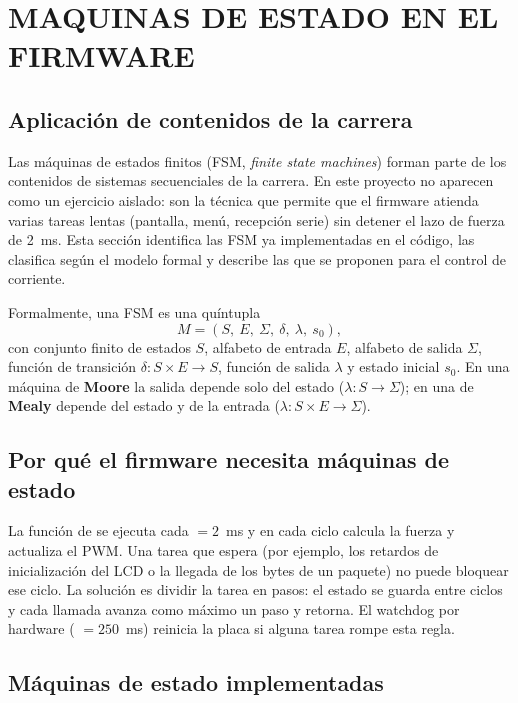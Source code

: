 \section{MAQUINAS DE ESTADO EN EL FIRMWARE}
\label{sec:maquinas_estado}

\subsection{Aplicación de contenidos de la carrera}
\label{sec:fsm_carrera}

Las máquinas de estados finitos (FSM, \textit{finite state machines}) forman parte de los contenidos de sistemas secuenciales de la carrera. En este proyecto no aparecen como un ejercicio aislado: son la técnica que permite que el firmware atienda varias tareas lentas (pantalla, menú, recepción serie) sin detener el lazo de fuerza de 2~ms. Esta sección identifica las FSM ya implementadas en el código, las clasifica según el modelo formal y describe las que se proponen para el control de corriente.

Formalmente, una FSM es una quíntupla
\[
M = (S,\ E,\ \Sigma,\ \delta,\ \lambda,\ s_0),
\]
con conjunto finito de estados $S$, alfabeto de entrada $E$, alfabeto de salida $\Sigma$, función de transición $\delta: S \times E \to S$, función de salida $\lambda$ y estado inicial $s_0$. En una máquina de \textbf{Moore} la salida depende solo del estado ($\lambda: S \to \Sigma$); en una de \textbf{Mealy} depende del estado y de la entrada ($\lambda: S \times E \to \Sigma$).

\subsection{Por qué el firmware necesita máquinas de estado}
\label{sec:fsm_motivo}

La función  de  se ejecuta cada  $= 2$~ms y en cada ciclo calcula la fuerza y actualiza el PWM. Una tarea que espera (por ejemplo, los retardos de inicialización del LCD o la llegada de los bytes de un paquete) no puede bloquear ese ciclo. La solución es dividir la tarea en pasos: el estado se guarda entre ciclos y cada llamada avanza como máximo un paso y retorna. El watchdog por hardware ( $=250$~ms) reinicia la placa si alguna tarea rompe esta regla.

\subsection{Máquinas de estado implementadas}
\label{sec:fsm_implementadas}

